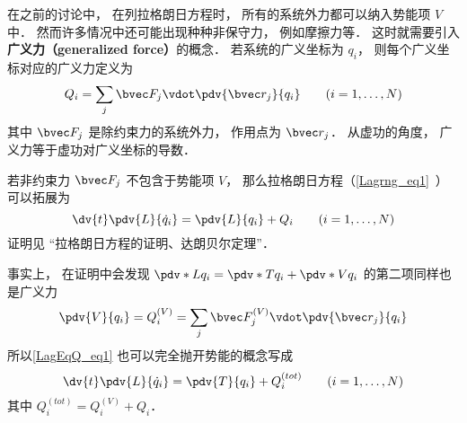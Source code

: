 
\begin{issues}
\issueTODO
\end{issues}


在之前的讨论中， 在列拉格朗日方程时， 所有的系统外力都可以纳入势能项 $V$ 中． 然而许多情况中还可能出现种种非保守力， 例如摩擦力等． 这时就需要引入\textbf{广义力（generalized force）}的概念． 若系统的广义坐标为 $q_i$， 则每个广义坐标对应的广义力定义为
\begin{equation}
Q_i = \sum_j \bvec F_j \vdot \pdv{\bvec r_j}{q_i} \qquad (i=1,\dots,N)
\end{equation}
其中 $\bvec F_j$ 是除约束力的系统外力， 作用点为 $\bvec r_j$． 从虚功的角度， 广义力等于虚功对广义坐标的导数．

若非约束力 $\bvec F_j$ 不包含于势能项 $V$， 那么拉格朗日方程（\autoref{Lagrng_eq1}~）可以拓展为
\begin{equation}\label{LagEqQ_eq1}
\dv{t} \pdv{L}{\dot q_i} = \pdv{L}{q_i} + Q_i
\qquad (i=1,\dots,N)
\end{equation}
证明见 “拉格朗日方程的证明、达朗贝尔定理”．

事实上， 在证明中会发现 $\pdv*{L}{q_i} = \pdv*{T}{q_i} + \pdv*{V}{q_i}$ 的第二项同样也是广义力
\begin{equation}
\pdv{V}{q_i} = Q_i^{(V)} = \sum_j \bvec F_j^{(V)} \vdot \pdv{\bvec r_j}{q_i}
\end{equation}
所以\autoref{LagEqQ_eq1} 也可以完全抛开势能的概念写成
\begin{equation}
\dv{t} \pdv{L}{\dot q_i} = \pdv{T}{q_i} + Q_i^{(tot)}
\qquad (i=1,\dots,N)
\end{equation}
其中 $Q_i^{(tot)} = Q_i^{(V)} + Q_i$．

